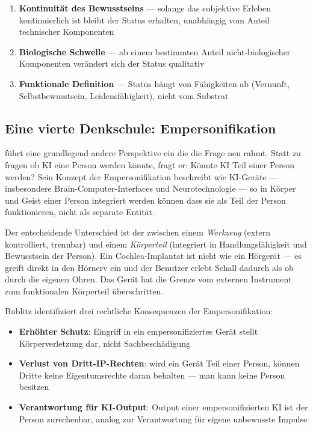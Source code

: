 \documentclass[acmcp, noacm]{acmart}
\begin{document}
\begin{enumerate}
\item \textbf{Kontinuität des Bewusstseins} --- solange das subjektive Erleben kontinuierlich ist bleibt der Status erhalten, unabhängig vom Anteil technischer Komponenten
\item \textbf{Biologische Schwelle} --- ab einem bestimmten Anteil nicht-biologischer Komponenten verändert sich der Status qualitativ
\item \textbf{Funktionale Definition} --- Status hängt von Fähigkeiten ab (Vernunft, Selbstbewusstsein, Leidensfähigkeit), nicht vom Substrat
\end{enumerate}

\subsection{Eine vierte Denkschule: Empersonifikation}

\cite{bublitz2024} führt eine grundlegend andere Perspektive ein die die Frage neu rahmt. Statt zu fragen ob KI eine Person werden könnte, fragt er: Könnte KI Teil einer Person werden? Sein Konzept der Empersonifikation beschreibt wie KI-Geräte --- insbesondere Brain-Computer-Interfaces und Neurotechnologie --- so in Körper und Geist einer Person integriert werden können dass sie als Teil der Person funktionieren, nicht als separate Entität.

Der entscheidende Unterschied ist der zwischen einem \textit{Werkzeug} (extern kontrolliert, trennbar) und einem \textit{Körperteil} (integriert in Handlungsfähigkeit und Bewusstsein der Person). Ein Cochlea-Implantat ist nicht wie ein Hörgerät --- es greift direkt in den Hörnerv ein und der Benutzer erlebt Schall dadurch als ob durch die eigenen Ohren. Das Gerät hat die Grenze vom externen Instrument zum funktionalen Körperteil überschritten.

Bublitz identifiziert drei rechtliche Konsequenzen der Empersonifikation:
\begin{itemize}
\item \textbf{Erhöhter Schutz}: Eingriff in ein empersonifiziertes Gerät stellt Körperverletzung dar, nicht Sachbeschädigung
\item \textbf{Verlust von Dritt-IP-Rechten}: wird ein Gerät Teil einer Person, können Dritte keine Eigentumsrechte daran behalten --- man kann keine Person besitzen
\item \textbf{Verantwortung für KI-Output}: Output einer empersonifizierten KI ist der Person zurechenbar, analog zur Verantwortung für eigene unbewusste Impulse
\end{itemize}
\end{document}
